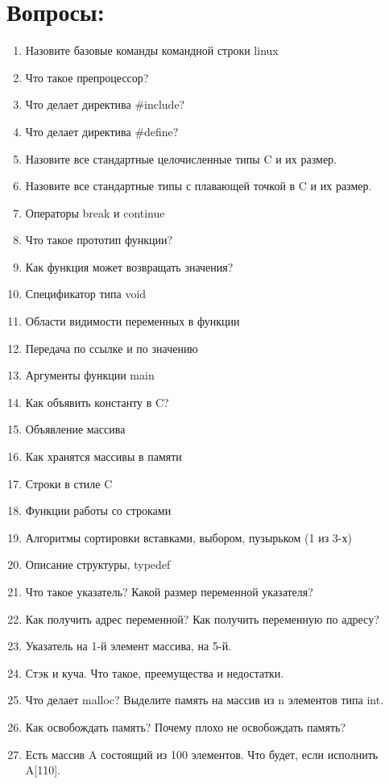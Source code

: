 \documentclass{article}
\begin{document}
\section*{Вопросы:}

\begin{enumerate}

\item Назовите базовые команды командной строки linux
\item Что такое препроцессор?
\item Что делает директива \#include?
\item Что делает директива \#define?
\item Назовите все стандартные целочисленные типы C и их размер.
\item Назовите все стандартные типы с плавающей точкой в C и их размер.
\item Операторы break и continue
\item Что такое прототип функции?
\item Как функция может возвращать значения?
\item Спецификатор типа void
\item Области видимости переменных в функции
\item Передача по ссылке и по значению
\item Аргументы функции main
\item Как объявить константу в C?
\item Объявление массива
\item Как хранятся массивы в памяти
\item Строки в стиле C
\item Функции работы со строками
\item Алгоритмы сортировки вставками, выбором, пузырьком (1 из 3-х)
\item Описание структуры, typedef
\item Что такое указатель? Какой размер переменной указателя? 
\item Как получить адрес переменной? Как получить переменную по адресу?
\item Указатель на 1-й элемент массива, на 5-й.
\item Стэк и куча. Что такое, преемущества и недостатки.
\item Что делает malloc? Выделите память на массив из n элементов типа int.
\item Как освобождать память? Почему плохо не освобождать память?
\item Есть массив A состоящий из 100 элементов. Что будет, если исполнить A[110].

\end{enumerate}
\end{document}
